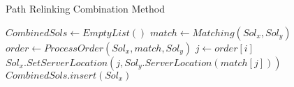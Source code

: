 \begin{algorithm}
  \caption{Path Relinking Combination Method}\label{pr_combination}
  \begin{algorithmic}[0]
    \State $CombinedSols \gets EmptyList()$
    \State $match \gets Matching(Sol_x,Sol_y)$
    \State $order \gets ProcessOrder(Sol_x,match,Sol_y)$
    \State $j \gets order[i]$
    \State $Sol_x.SetServerLocation(j,Sol_y.ServerLocation(match[j]))$
    \State $CombinedSols.insert(Sol_x)$
    \EndIf \EndFor
    \EndProcedure
  \end{algorithmic}
\end{algorithm}
